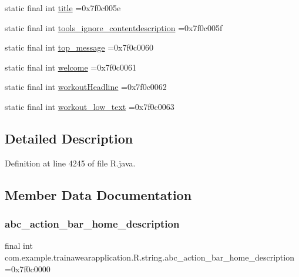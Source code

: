 \begin{DoxyCompactItemize}
\item 
static final int \mbox{\hyperlink{classcom_1_1example_1_1trainawearapplication_1_1_r_1_1string_ab8a72ccdfedc51e0f212851f30f4bac8}{title}} =0x7f0c005e
\item 
static final int \mbox{\hyperlink{classcom_1_1example_1_1trainawearapplication_1_1_r_1_1string_a461c8f359916f76cb3b083b483c6d866}{tools\+\_\+ignore\+\_\+contentdescription}} =0x7f0c005f
\item 
static final int \mbox{\hyperlink{classcom_1_1example_1_1trainawearapplication_1_1_r_1_1string_adbcbe114be0da7b15dfc49e7a5d4aa98}{top\+\_\+message}} =0x7f0c0060
\item 
static final int \mbox{\hyperlink{classcom_1_1example_1_1trainawearapplication_1_1_r_1_1string_a66c7d74bd8a8f7eebbe43f042a1c1548}{welcome}} =0x7f0c0061
\item 
static final int \mbox{\hyperlink{classcom_1_1example_1_1trainawearapplication_1_1_r_1_1string_abf8bce5fc2a7b055f6d5404aa451d626}{workout\+Headline}} =0x7f0c0062
\item 
static final int \mbox{\hyperlink{classcom_1_1example_1_1trainawearapplication_1_1_r_1_1string_aa5cfc5ea069b47aec4828642065a29b6}{workout\+\_\+low\+\_\+text}} =0x7f0c0063
\end{DoxyCompactItemize}


\subsection{Detailed Description}


Definition at line 4245 of file R.\+java.



\subsection{Member Data Documentation}
\mbox{\label{classcom_1_1example_1_1trainawearapplication_1_1_r_1_1string_aefbaa1c8972461a189212a1e00620ae7}} 
\subsubsection{\texorpdfstring{abc\_action\_bar\_home\_description}{abc\_action\_bar\_home\_description}}
{\footnotesize\ttfamily final int com.\+example.\+trainawearapplication.\+R.\+string.\+abc\+\_\+action\+\_\+bar\+\_\+home\+\_\+description =0x7f0c0000\hspace{0.3cm}{\ttfamily [static]}}




